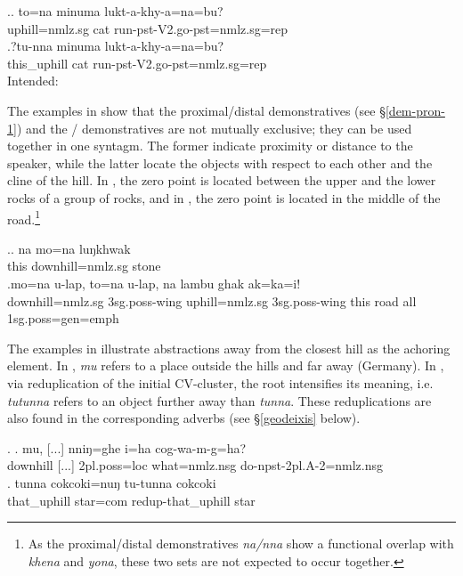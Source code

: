 \ex.\ag. to=na minuma lukt-a-khy-a=na=bu?\\
uphill{\sc =nmlz.sg} cat run{\sc [3sg]-pst-V2.go-pst=nmlz.sg=rep} \\
\bg.?tu-nna minuma lukt-a-khy-a=na=bu?\\
this\_uphill cat run{\sc [3sg]-pst-V2.go-pst=nmlz.sg=rep} \\
Intended: 
 
The examples in \Next show that the proximal/distal demonstratives (see  §\ref{dem-pron-1}) and the / demonstratives are not mutually exclusive; they can be used together in one syntagm. The former indicate proximity or distance to the speaker, while the latter locate the objects with respect to each other and the cline of the hill. In \Next[a], the zero point is located between the upper and the lower rocks of a group of rocks, and in \Next[b], the zero point is located in the middle of the road.\footnote{As the proximal/distal demonstratives \emph{na/nna} show a functional overlap with \emph{khena} and \emph{yona}, these two sets are not expected to occur together.}

\ex.\ag.  na   mo=na  luŋkhwak\\
this downhill{\sc =nmlz.sg} stone\\
 
\bg.mo=na  u-lap,          to=na  u-lap,          na   lambu ghak ak=ka=i!\\
downhill{\sc =nmlz.sg} {\sc 3sg.poss-}wing uphill{\sc =nmlz.sg}  {\sc 3sg.poss-}wing this road all {\sc 1sg.poss=gen=emph} \\
  


The examples in \Next illustrate abstractions away from the closest hill as the achoring element. In \Next[a],  \emph{mu} refers to a place outside the hills and far away (Germany). In \Next[b], via reduplication of the initial CV-cluster, the root  intensifies its meaning, i.e. \emph{tutunna} refers to an object further away than \emph{tunna}. These reduplications are also found in the corresponding adverbs (see §\ref{geodeixis} below). 

\ex. \ag. mu, [...] nniŋ=ghe i=ha cog-wa-m-g=ha?\\
	downhill [...] {\sc 2pl.poss=loc} what{\sc =nmlz.nsg} do{\sc -npst-2pl.A-2=nmlz.nsg}\\
	 
\bg. tunna cokcoki=nuŋ tu-tunna cokcoki\\
		that\_uphill star{\sc =com}	{\sc redup-}that\_uphill star\\


